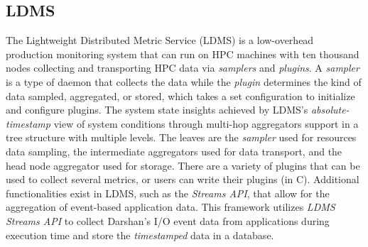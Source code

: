 \subsection{LDMS}
The Lightweight Distributed Metric Service (LDMS) is a low-overhead production monitoring system that can run on HPC machines with ten thousand nodes collecting and transporting HPC data via \emph{samplers} and \emph{plugins}. A \emph{sampler} is a type of daemon that collects the data while the \emph{plugin} determines the kind of data sampled, aggregated, or stored, which takes a set configuration to initialize and configure plugins. 
The system state insights achieved by LDMS's \emph{absolute-timestamp} view of system conditions through multi-hop aggregators support in a tree structure with multiple levels. The leaves are the \emph{sampler} used for resources data sampling, the intermediate aggregators used for data transport, and the head node aggregator used for storage. There are a variety of plugins that can be used to collect several metrics, or users can write their plugins (in C).
Additional functionalities exist in LDMS, such as the \emph{Streams API}, that allow for the aggregation of event-based application data. This framework utilizes \emph{LDMS Streams API} to collect Darshan's I/O event data from applications during execution time and store the \emph{timestamped} data in a database.
